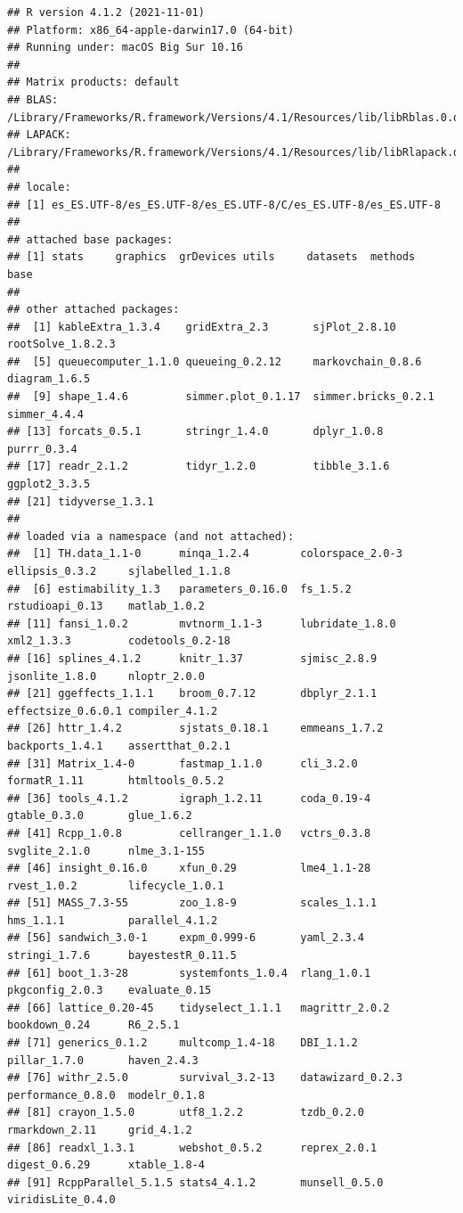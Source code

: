 \documentclass[
]{book}
\theoremstyle{definition}
\theoremstyle{definition}
\theoremstyle{definition}
\theoremstyle{definition}
\theoremstyle{remark}
\begin{document}
\begin{verbatim}
## R version 4.1.2 (2021-11-01)
## Platform: x86_64-apple-darwin17.0 (64-bit)
## Running under: macOS Big Sur 10.16
## 
## Matrix products: default
## BLAS:   /Library/Frameworks/R.framework/Versions/4.1/Resources/lib/libRblas.0.dylib
## LAPACK: /Library/Frameworks/R.framework/Versions/4.1/Resources/lib/libRlapack.dylib
## 
## locale:
## [1] es_ES.UTF-8/es_ES.UTF-8/es_ES.UTF-8/C/es_ES.UTF-8/es_ES.UTF-8
## 
## attached base packages:
## [1] stats     graphics  grDevices utils     datasets  methods   base     
## 
## other attached packages:
##  [1] kableExtra_1.3.4    gridExtra_2.3       sjPlot_2.8.10       rootSolve_1.8.2.3  
##  [5] queuecomputer_1.1.0 queueing_0.2.12     markovchain_0.8.6   diagram_1.6.5      
##  [9] shape_1.4.6         simmer.plot_0.1.17  simmer.bricks_0.2.1 simmer_4.4.4       
## [13] forcats_0.5.1       stringr_1.4.0       dplyr_1.0.8         purrr_0.3.4        
## [17] readr_2.1.2         tidyr_1.2.0         tibble_3.1.6        ggplot2_3.3.5      
## [21] tidyverse_1.3.1    
## 
## loaded via a namespace (and not attached):
##  [1] TH.data_1.1-0      minqa_1.2.4        colorspace_2.0-3   ellipsis_0.3.2     sjlabelled_1.1.8  
##  [6] estimability_1.3   parameters_0.16.0  fs_1.5.2           rstudioapi_0.13    matlab_1.0.2      
## [11] fansi_1.0.2        mvtnorm_1.1-3      lubridate_1.8.0    xml2_1.3.3         codetools_0.2-18  
## [16] splines_4.1.2      knitr_1.37         sjmisc_2.8.9       jsonlite_1.8.0     nloptr_2.0.0      
## [21] ggeffects_1.1.1    broom_0.7.12       dbplyr_2.1.1       effectsize_0.6.0.1 compiler_4.1.2    
## [26] httr_1.4.2         sjstats_0.18.1     emmeans_1.7.2      backports_1.4.1    assertthat_0.2.1  
## [31] Matrix_1.4-0       fastmap_1.1.0      cli_3.2.0          formatR_1.11       htmltools_0.5.2   
## [36] tools_4.1.2        igraph_1.2.11      coda_0.19-4        gtable_0.3.0       glue_1.6.2        
## [41] Rcpp_1.0.8         cellranger_1.1.0   vctrs_0.3.8        svglite_2.1.0      nlme_3.1-155      
## [46] insight_0.16.0     xfun_0.29          lme4_1.1-28        rvest_1.0.2        lifecycle_1.0.1   
## [51] MASS_7.3-55        zoo_1.8-9          scales_1.1.1       hms_1.1.1          parallel_4.1.2    
## [56] sandwich_3.0-1     expm_0.999-6       yaml_2.3.4         stringi_1.7.6      bayestestR_0.11.5 
## [61] boot_1.3-28        systemfonts_1.0.4  rlang_1.0.1        pkgconfig_2.0.3    evaluate_0.15     
## [66] lattice_0.20-45    tidyselect_1.1.1   magrittr_2.0.2     bookdown_0.24      R6_2.5.1          
## [71] generics_0.1.2     multcomp_1.4-18    DBI_1.1.2          pillar_1.7.0       haven_2.4.3       
## [76] withr_2.5.0        survival_3.2-13    datawizard_0.2.3   performance_0.8.0  modelr_0.1.8      
## [81] crayon_1.5.0       utf8_1.2.2         tzdb_0.2.0         rmarkdown_2.11     grid_4.1.2        
## [86] readxl_1.3.1       webshot_0.5.2      reprex_2.0.1       digest_0.6.29      xtable_1.8-4      
## [91] RcppParallel_5.1.5 stats4_4.1.2       munsell_0.5.0      viridisLite_0.4.0
\end{verbatim}
\end{document}

